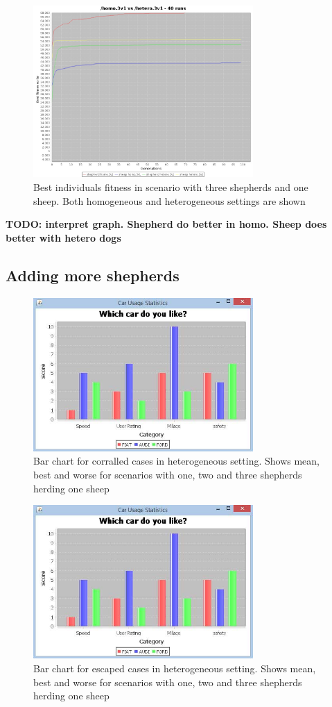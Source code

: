 \documentclass[conference]{IEEEtran}
\begin{document}
\begin{figure}[ht]
	\centering
	\includegraphics[width=3.3in]{imgs/homo3v1-hetero3v1-bestSoFar.jpeg}
	\caption{Best individuals fitness in scenario with three shepherds and one sheep. Both homogeneous and heterogeneous settings are shown}
	\label{fig:3v1_homo_vs_hetero}
\end{figure}

\textbf{TODO: interpret graph. Shepherd do better in homo. Sheep does better with hetero dogs}


\subsection{Adding more shepherds}

\begin{figure}[ht]
	\centering
	\includegraphics[width=3.3in]{imgs/barchart.jpg}
	\caption{Bar chart for corralled cases in heterogeneous setting. Shows mean, best and worse for scenarios with one, two and three shepherds herding one sheep}
	\label{fig:corralled_oneSheep}
\end{figure}

\begin{figure}[ht]
	\centering
	\includegraphics[width=3.3in]{imgs/barchart.jpg}
	\caption{Bar chart for escaped cases in heterogeneous setting. Shows mean, best and worse for scenarios with one, two and three shepherds herding one sheep}
	\label{fig:escaped_oneSheep}
\end{figure}
\end{document}
